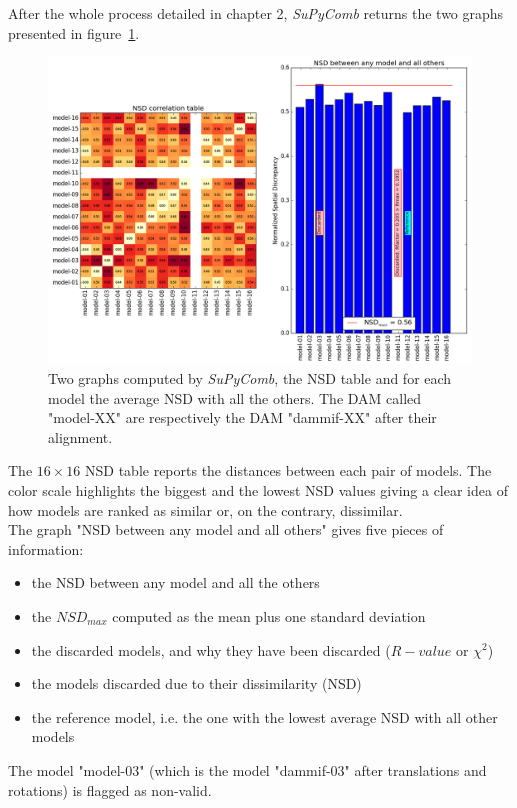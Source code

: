 \documentclass[a4paper, 11pt]{report}
\begin{document}
After the whole process detailed in chapter 2, \textit{SuPyComb} 
returns the two graphs presented in figure~\ref{fgr:nsd}. 
\begin{figure}
\centering
\includegraphics[scale=0.45]{nsd.png}
\caption{Two graphs computed by \textit{SuPyComb}, the NSD table and 
         for each model the average NSD with all the others. The DAM 
         called "model-XX" are respectively the DAM "dammif-XX" after 
         their alignment.}
\label{fgr:nsd}
\end{figure}
The $16 \times 16$ NSD table reports the distances between each pair 
of models. 
The color scale highlights the biggest and the lowest NSD values 
giving a clear idea of how models are ranked as similar or, on the 
contrary, dissimilar.\\
The graph "NSD between any model and all others" gives five pieces of 
information:
\begin{itemize}
\item the NSD between any model and all the others
\item the $NSD_{max}$ computed as the mean plus one standard deviation
\item the discarded models, and why they have been discarded ($R-value$ 
      or $\chi^{2}$)
\item the models discarded due to their dissimilarity (NSD)
\item the reference model, i.e. the one with the lowest average NSD with 
      all other models
\end{itemize}
The model "model-03" (which is the model "dammif-03" after 
translations and rotations) is flagged as non-valid.
\end{document}
